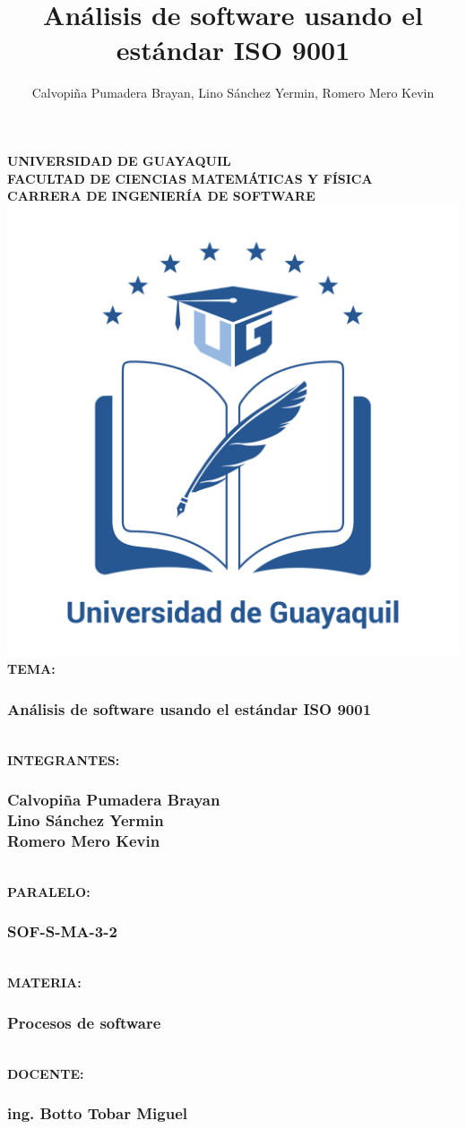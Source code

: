 \documentclass[12pt,a4paper]{article}
\author{Calvopiña Pumadera Brayan, Lino Sánchez Yermin, Romero Mero Kevin}
\title{Análisis de software usando el estándar ISO 9001}
\begin{document}
\begin{center}
\textbf{UNIVERSIDAD DE GUAYAQUIL\\
FACULTAD DE CIENCIAS MATEMÁTICAS Y FÍSICA\\
CARRERA DE INGENIERÍA DE SOFTWARE\\}
\includegraphics[scale=0.1]{ug.png} 
\textbf{\\TEMA:}
\subsubsection*{Análisis de software usando el estándar ISO 9001\\
}
\textbf{\\INTEGRANTES:}
\subsubsection*{Calvopiña Pumadera Brayan\\Lino Sánchez Yermin\\Romero Mero Kevin\\}
\textbf{\\PARALELO:}
\subsubsection*{SOF-S-MA-3-2\\}
\textbf{\\MATERIA:}
\subsubsection*{Procesos de software\\}
\textbf{\\DOCENTE:}
\subsubsection*{ing. Botto Tobar Miguel}
\end{center}
\newpage
\end{document}
